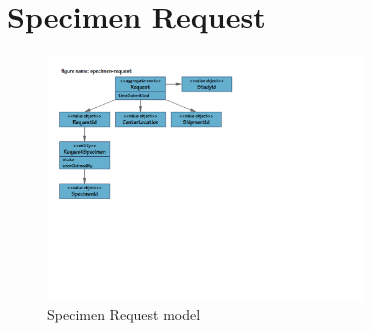 \chapter{Specimen Request}
\label{chap:specimen-request}

\begin{figure}[H]
  \centering
  \includegraphics[trim={10mm 88mm 117mm 18mm}, clip,
    width=0.75\textwidth]{images/specimen-request}
  \caption{Specimen Request model}
  \label{fig:specimen-request}
\end{figure}

